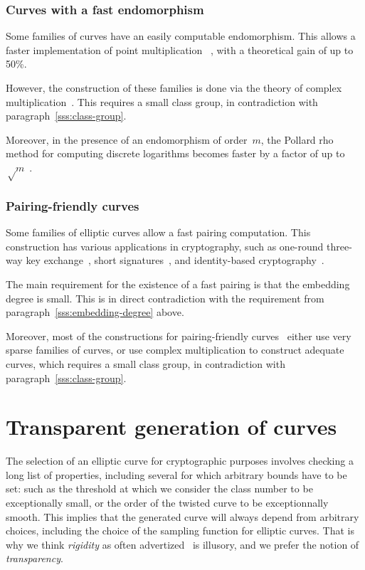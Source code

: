 \documentclass[twocolumn,letterpaper,10pt]{article}
\begin{document}
\subsubsection{Curves with a fast endomorphism}

Some families of curves have an easily computable endomorphism.
This allows a faster implementation of point multiplication%
~\cite{crypto2001glv,joc2011gls}, with a theoretical gain of up to 50\%.

However, the construction of these families
is done via the theory of complex multiplication~\cite{asia2013smith}.
This requires a small class group,
in contradiction with paragraph~\ref{sss:class-group}.

Moreover, in the presence of an endomorphism of order~$m$,
the Pollard rho method for computing discrete logarithms
becomes faster by a factor of up to~$√m$~\cite{asia1999dgm,moc2000glv}.

\subsubsection{Pairing-friendly curves}
\label{sss:pairing}

Some families of elliptic curves allow a fast pairing computation.
This construction has various applications in cryptography,
such as one-round three-way key exchange~\cite{jc2004joux},
short signatures~\cite{jc2004bls},
and identity-based cryptography~\cite{crypto2001bf,el2002paterson}.

The main requirement for the existence of a fast pairing
is that the embedding degree is small.
This is in direct contradiction with
the requirement from paragraph~\ref{sss:embedding-degree} above.

Moreover, most of the constructions
for pairing-friendly curves~\cite{jc2010fst,space2014em}
either use very sparse families of curves,
or use complex multiplication to construct adequate curves,
which requires a small class group,
in contradiction with paragraph~\ref{sss:class-group}.

\section{Transparent generation of curves}
\label{s:certif}

The selection of an elliptic curve for cryptographic purposes
involves checking a long list of properties,
including several for which arbitrary bounds have to be set:
such as the threshold at which we consider the class number
to be exceptionally small,
or the order of the twisted curve to be exceptionnally smooth.
This implies that the generated curve
will always depend from arbitrary choices,
including the choice of the sampling function for elliptic curves.
That is why we think \emph{rigidity} as often advertized~\cite{safecurves}
is illusory, and we prefer the notion of \emph{transparency}.
\end{document}
